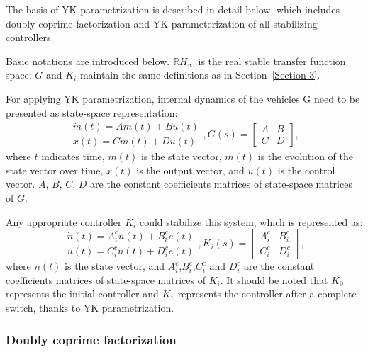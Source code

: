 \documentclass[a4paper,fleqn]{cas-sc}
\begin{document}
The basis of YK parametrization is described in detail below, which includes doubly coprime factorization and YK parameterization of all stabilizing controllers.

Basic notations are introduced below. $\mathbb{R} H_{\infty}$ is the real stable transfer function space; $G$ and $K_i$ maintain the same definitions as in Section~\ref{Section 3}.

For applying YK parametrization, internal dynamics of the vehicles G need to be presented as state-space representation:
\begin{equation}
  \begin{gathered}
    \dot{m}(t)=A m(t)+B u(t) \\
    x(t)=C m(t)+D u(t)
  \end{gathered}, G(s)=\left[\begin{array}{ll}
      A & B \\
      C & D
    \end{array}\right],
\end{equation}
where $t$ indicates time, $m(t)$ is the state vector, $\dot{m}(t)$ is the evolution of the state vector over time, $x(t)$ is the output vector, and $u(t)$ is the control vector. $A$, $B$, $C$, $D$ are the constant coefficients matrices of state-space matrices of $G$.

Any appropriate controller $K_i$ could stabilize this system, which is represented as:
\begin{equation}
  \begin{gathered}
    \dot{n}(t)=A_{i}^{c} n(t)+B_{i}^{c} e(t) \\
    u(t)=C_{i}^{c} n(t)+D_{i}^{c} e(t)
  \end{gathered}, K_{i}(s)=\left[\begin{array}{ll}
      A_{i}^{c} & B_{i}^{c} \\
      C_{i}^{c} & D_{i}^{c}
    \end{array}\right],
\end{equation}
where $n(t)$ is the state vector, and $A_i^c$,$B_i^c$,$C_i^c$ and $D_i^c$ are the constant coefficients matrices of state-space matrices of $K_i$. It should be noted that $K_0$ represents the initial controller and $K_1$ represents the controller after a complete switch, thanks to YK parametrization.

\subsubsection{Doubly coprime factorization}
\label{Section 3.2.2}
\end{document}
